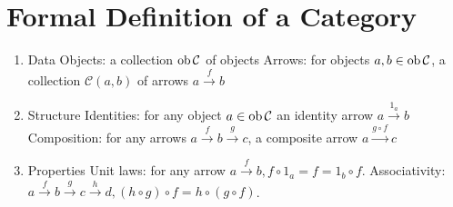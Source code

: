 \setcounter{section}{7}
\section{Formal Definition of a Category}
\begin{enumerate}
    \item Data
        \subitem Objects: a collection $\text{ob}\thinspace\mathcal{C}{}$ of objects
        \subitem Arrows: for objects $a, b\in \text{ob}\thinspace\mathcal{C}{}$, a collection
        $\mathcal{C}(a, b)$ of arrows $a \overset{f}{\rightarrow} b$
    \item Structure
        \subitem Identities: for any object $a\in\text{ob}\thinspace\mathcal{C}{}$ an identity arrow
        $a \overset{1_a}{\rightarrow} b$
        \subitem Composition: for any arrows
        $a \overset{f}{\rightarrow} b \overset{g}{\rightarrow} c$, a composite arrow
        $a \overset{g\circ f}{\rightarrow} c$
    \item Properties
        \subitem Unit laws: for any arrow $a \overset{f}{\rightarrow} b, f\circ
        1_a = f = 1_b \circ f$.
        \subitem Associativity:
        $a \overset{f}{\rightarrow} b \overset{g}{\rightarrow} c
        \overset{h}{\rightarrow} d, (h\circ g)\circ f=h\circ (g \circ f)$.
\end{enumerate}
